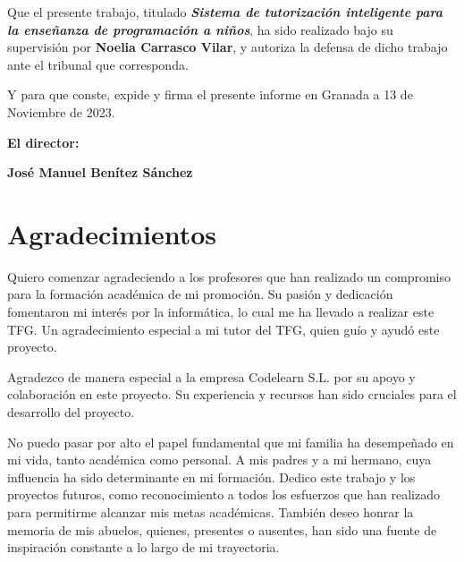 \vspace{0.5cm}

Que el presente trabajo, titulado \textit{\textbf{Sistema de tutorización inteligente para la enseñanza de programación a niños}}, ha sido realizado bajo su supervisión por \textbf{Noelia Carrasco Vilar}, y autoriza la defensa de dicho trabajo ante el tribunal que corresponda.

\vspace{0.5cm}

Y para que conste, expide y firma el presente informe en Granada a 13 de
Noviembre de 2023.

\vspace{1cm}

\textbf{El director:}

\vspace{5cm}

\noindent \textbf{José Manuel Benítez Sánchez}

\chapter*{Agradecimientos}

Quiero comenzar agradeciendo a los profesores que han realizado un compromiso para la formación académica de mi promoción. Su pasión y dedicación fomentaron mi interés por la informática, lo cual me ha llevado a realizar este TFG. Un agradecimiento especial a mi tutor del TFG, quien guío y ayudó este proyecto.

Agradezco de manera especial a la empresa Codelearn S.L. por su apoyo y colaboración en este proyecto. Su experiencia y recursos han sido cruciales para el desarrollo del proyecto.

No puedo pasar por alto el papel fundamental que mi familia ha desempeñado en mi vida, tanto académica como personal. A mis padres y a mi hermano, cuya influencia ha sido determinante en mi formación. Dedico este trabajo y los proyectos futuros, como reconocimiento a todos los esfuerzos que han realizado para permitirme alcanzar mis metas académicas.  También deseo honrar la memoria de mis abuelos, quienes, presentes o ausentes, han sido una fuente de inspiración constante a lo largo de mi trayectoria.


